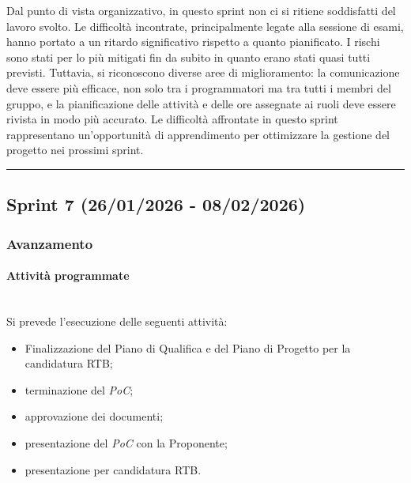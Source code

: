 \documentclass[10pt, letterpaper]{article}
\newcommand{\trisubsection}[1]{\paragraph{#1}\mbox{}\\}
\begin{document}
Dal punto di vista organizzativo, in questo sprint non ci si ritiene soddisfatti del lavoro svolto. Le difficoltà incontrate, principalmente legate alla sessione di esami, hanno portato a un ritardo significativo rispetto a quanto pianificato. I rischi sono stati per lo più mitigati fin da subito in quanto erano stati quasi tutti previsti. Tuttavia, si riconoscono diverse aree di miglioramento: la comunicazione deve essere più efficace, non solo tra i programmatori ma tra tutti i membri del gruppo, e la pianificazione delle attività e delle ore assegnate ai ruoli deve essere rivista in modo più accurato. Le difficoltà affrontate in questo sprint rappresentano un'opportunità di apprendimento per ottimizzare la gestione del progetto nei prossimi sprint.

\vspace{1em}
\hrule
\vspace{1em}

\subsection{Sprint 7 (26/01/2026 - 08/02/2026)}
\subsubsection{Avanzamento}
\trisubsection{Attività programmate}
Si prevede l'esecuzione delle seguenti attività:
\begin{itemize}
    \item Finalizzazione del Piano di Qualifica e del Piano di Progetto per la candidatura RTB;
    \item terminazione del \textit{PoC};
    \item approvazione dei documenti;
    \item presentazione del \textit{PoC} con la Proponente;
    \item presentazione per candidatura RTB.
\end{itemize}
\end{document}
